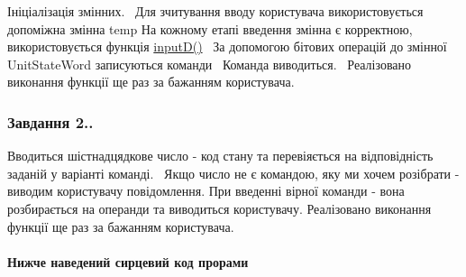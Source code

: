 Ініціалізація змінних.~\newline
Для зчитування вводу користувача використовується допоміжна змінна {\ttfamily temp} На кожному етапі введення змінна є корректною, використовується функція \hyperlink{main_8c_aa9f623385e5c1c8ac44a985d44cf3c5a}{input\+D()}~\newline
За допомогою бітових операцій до змінної {\ttfamily Unit\+State\+Word} записуються команди~\newline
Команда виводиться.~\newline
Реалізовано виконання функції ще раз за бажанням користувача. \subsubsection*{Завдання 2..}

Вводиться шістнадцядкове число -\/ код стану та перевіяється на відповідність заданій у варіанті команді.~\newline
Якщо число не є командою, яку ми хочем розібрати -\/ виводим користувачу повідомлення. При введенні вірної команди -\/ вона розбирається на операнди та виводиться користувачу. Реалізовано виконання функції ще раз за бажанням користувача. \paragraph*{Нижче наведений сирцевий код прорами}


